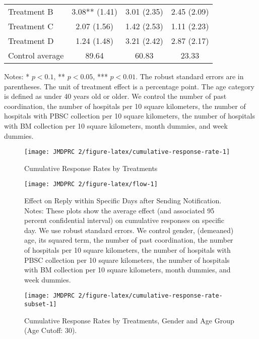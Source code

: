 \documentclass[12pt, a4paper]{article}
\begin{document}
\begin{table}[H]
\begin{threeparttable}
\begin{tabular}[t]{lccc}
\hspace{1em}Treatment B & 3.08** (1.41) & 3.01 (2.35) & 2.45 (2.09)\\
\hspace{1em}Treatment C & 2.07 (1.56) & 1.42 (2.53) & 1.11 (2.23)\\
\hspace{1em}Treatment D & 1.24 (1.48) & 3.21 (2.42) & 2.87 (2.17)\\
\hspace{1em}Control average & 89.64 & 60.83 & 23.33\\
\bottomrule
\end{tabular}
\begin{tablenotes}
\item Notes: * $p < 0.1$, ** $p < 0.05$, *** $p < 0.01$. The robust standard errors are in parentheses. The unit of treatment effect is a percentage point. The age category is defined as under 40 years old or older. We control the number of past coordination, the number of hospitals per 10 square kilometers, the number of hospitals with PBSC collection per 10 square kilometers, the number of hospitals with BM collection per 10 square kilometers, month dummies, and week dummies.
\end{tablenotes}
\end{threeparttable}
\end{table}

\begin{figure}[H]
\texttt{[image: JMDPRC~2/figure-latex/cumulative-response-rate-1]} \caption{Cumulative Response Rates by Treatments}\label{fig:cumulative-response-rate}
\end{figure}

\begin{figure}[H]
\texttt{[image: JMDPRC~2/figure-latex/flow-1]} \caption{Effect on Reply within Specific Days after Sending Notification. Notes: These plots show the average effect (and associated 95 percent confidential interval) on cumulative responses on specific day. We use robust standard errors. We control gender, (demeaned) age, its squared term, the number of past coordination, the number of hospitals per 10 square kilometers, the number of hospitals with PBSC collection per 10 square kilometers, the number of hospitals with BM collection per 10 square kilometers, month dummies, and week dummies.}\label{fig:flow}
\end{figure}

\begin{figure}[H]
\texttt{[image: JMDPRC~2/figure-latex/cumulative-response-rate-subset-1]} \caption{Cumulative Response Rates by Treatments, Gender and Age Group (Age Cutoff: 30).}\label{fig:cumulative-response-rate-subset}
\end{figure}
\end{document}

